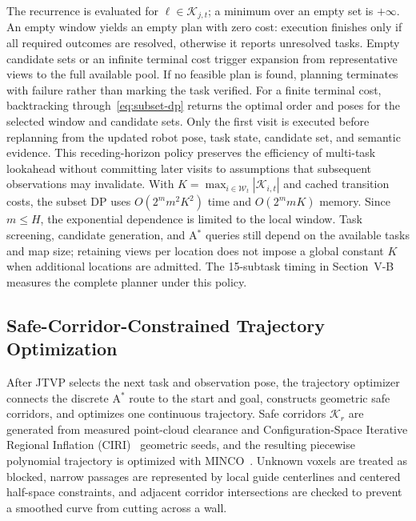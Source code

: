 \documentclass[letterpaper,10pt,journal]{IEEEtran}
\begin{document}
The recurrence is evaluated for $\ell\in\mathcal K_{j,t}$; a minimum over an empty set is $+\infty$. An empty window yields an empty plan with zero cost: execution finishes only if all required outcomes are resolved, otherwise it reports unresolved tasks. Empty candidate sets or an infinite terminal cost trigger expansion from representative views to the full available pool. If no feasible plan is found, planning terminates with failure rather than marking the task verified. For a finite terminal cost, backtracking through~\eqref{eq:subset-dp} returns the optimal order and poses for the selected window and candidate sets. Only the first visit is executed before replanning from the updated robot pose, task state, candidate set, and semantic evidence. This receding-horizon policy preserves the efficiency of multi-task lookahead without committing later visits to assumptions that subsequent observations may invalidate. With $K=\max_{i\in\mathcal W_t}|\mathcal K_{i,t}|$ and cached transition costs, the subset DP uses $O(2^m m^2K^2)$ time and $O(2^m mK)$ memory. Since $m\leq H$, the exponential dependence is limited to the local window. Task screening, candidate generation, and A$^*$ queries still depend on the available tasks and map size; retaining views per location does not impose a global constant $K$ when additional locations are admitted. The 15-subtask timing in Section~V-B measures the complete planner under this policy.

\subsection{Safe-Corridor-Constrained Trajectory Optimization}

After JTVP selects the next task and observation pose, the trajectory optimizer connects the discrete A$^*$ route to the start and goal, constructs geometric safe corridors, and optimizes one continuous trajectory. Safe corridors $\mathcal K_r$ are generated from measured point-cloud clearance and Configuration-Space Iterative Regional Inflation (CIRI)~\cite{ren2025super} geometric seeds, and the resulting piecewise polynomial trajectory is optimized with MINCO~\cite{wang2022minco}. Unknown voxels are treated as blocked, narrow passages are represented by local guide centerlines and centered half-space constraints, and adjacent corridor intersections are checked to prevent a smoothed curve from cutting across a wall.
\end{document}
